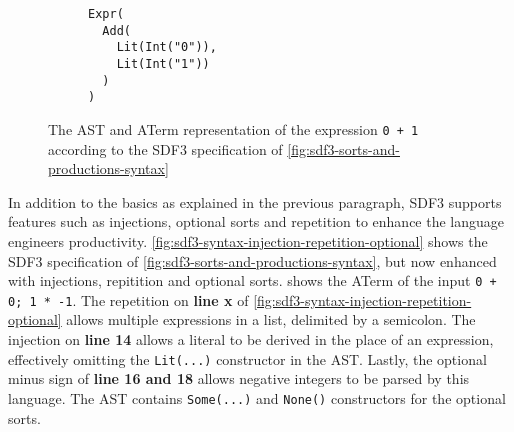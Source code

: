       \begin{figure}
        \begin{subfigure}[b]{0.5\textwidth}
          \centering
          \caption{\label{fig:example-AST-1-ast}}
        \end{subfigure}
        \begin{subfigure}[b]{0.5\textwidth}
          \begin{verbatim}
Expr(
  Add(
    Lit(Int("0")),
    Lit(Int("1"))
  )
)
          \end{verbatim}
          \caption{\label{fig:example-AST-1-aterm}}
        \end{subfigure}
        \caption{\label{fig:example-AST-1}The AST and ATerm representation of the expression \texttt{0 + 1} according to the SDF3 specification of \cref{fig:sdf3-sorts-and-productions-syntax}}
      \end{figure}

      In addition to the basics as explained in the previous paragraph, SDF3 supports features such as injections, optional sorts and repetition to enhance the language engineers productivity. \cref{fig:sdf3-syntax-injection-repetition-optional} shows the SDF3 specification of \cref{fig:sdf3-sorts-and-productions-syntax}, but now enhanced with injections, repitition and optional sorts.  shows the ATerm of the input \texttt{0 + 0; 1 * -1}. The repetition on \textbf{line x} of \cref{fig:sdf3-syntax-injection-repetition-optional} allows multiple expressions in a list, delimited by a semicolon. The injection on \textbf{line 14} allows a literal to be derived in the place of an expression, effectively omitting the \texttt{Lit(...)} constructor in the AST. Lastly, the optional minus sign of \textbf{line 16 and 18} allows negative integers to be parsed by this language. The AST contains \texttt{Some(...)} and \texttt{None()} constructors for the optional sorts.
        
